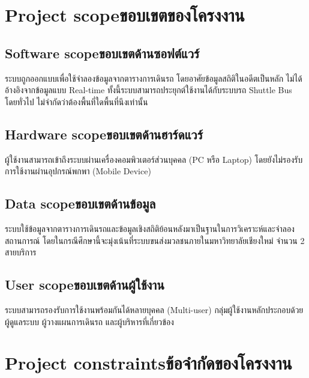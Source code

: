 \section{\ifenglish Project scope\else ขอบเขตของโครงงาน\fi}

\subsection{\ifenglish Software scope\else ขอบเขตด้านซอฟต์แวร์\fi}
    \begin{mypara}
        \indent ระบบถูกออกแบบเพื่อใช้จำลองข้อมูลจากตารางการเดินรถ โดยอาศัยข้อมูลสถิติในอดีตเป็นหลัก 
        ไม่ได้อ้างอิงจากข้อมูลแบบ Real-time ทั้งนี้ระบบสามารถประยุกต์ใช้งานได้กับระบบรถ 
        Shuttle Bus โดยทั่วไป ไม่จำกัดว่าต้องพื้นที่ใดพื้นที่นึงเท่านั้น
    \end{mypara}
\subsection{\ifenglish Hardware scope\else ขอบเขตด้านฮาร์ดแวร์\fi}
    \begin{mypara}
        \indent ผู้ใช้งานสามารถเข้าถึงระบบผ่านเครื่องคอมพิวเตอร์ส่วนบุคคล (PC หรือ Laptop)
         โดยยังไม่รองรับการใช้งานผ่านอุปกรณ์พกพา (Mobile Device)
    \end{mypara}
\subsection{\ifenglish Data scope\else ขอบเขตด้านข้อมูล\fi}
    \begin{mypara}
        \indent ระบบใช้ข้อมูลจากตารางการเดินรถและข้อมูลเชิงสถิติย้อนหลังมาเป็นฐานในการวิเคราะห์และจำลองสถานการณ์ 
        โดยในกรณีศึกษานี้จะมุ่งเน้นที่ระบบขนส่งมวลชนภายในมหาวิทยาลัยเชียงใหม่ จำนวน 2 สายบริการ
    \end{mypara}
\subsection{\ifenglish User scope\else ขอบเขตด้านผู้ใช้งาน\fi}
    \begin{mypara}
        \indent ระบบสามารถรองรับการใช้งานพร้อมกันได้หลายบุคคล (Multi-user) 
        กลุ่มผู้ใช้งานหลักประกอบด้วยผู้ดูแลระบบ ผู้วางแผนการเดินรถ และผู้บริหารที่เกี่ยวข้อง
    \end{mypara}

\section{\ifenglish Project constraints\else ข้อจำกัดของโครงงาน\fi}

